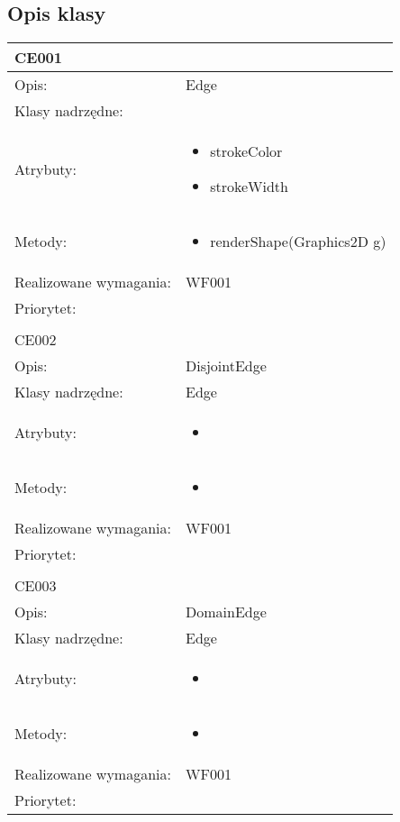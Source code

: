 \documentclass[a4paper,10pt]{article}
\begin{document}
\subsection{Opis klasy}

\begin{center}

\begin{tabular}{|m{3cm}|m{9cm}|} \hline

CE001 &  \\ \hline
Opis: & Edge    \\ \hline
Klasy nadrzędne: &     \\ \hline
Atrybuty: & \begin{itemize}
 \item strokeColor
 \item strokeWidth 
\end{itemize}
 \\ \hline
Metody: & \begin{itemize}
 \item renderShape(Graphics2D g)
\end{itemize}
  \\ \hline
Realizowane wymagania: & WF001 \\ \hline
Priorytet: &  \\ \hline

\multicolumn{2}{c}{} \\
 \hline

CE002 &  \\ \hline
Opis: & DisjointEdge    \\ \hline
Klasy nadrzędne: & Edge    \\ \hline
Atrybuty: & \begin{itemize}
 \item 
\end{itemize}
 \\ \hline
Metody: & \begin{itemize}
 \item 
\end{itemize}
  \\ \hline
Realizowane wymagania: & WF001 \\ \hline
Priorytet: &  \\ \hline

\multicolumn{2}{c}{} \\
 \hline

CE003 &  \\ \hline
Opis: & DomainEdge    \\ \hline
Klasy nadrzędne: & Edge    \\ \hline
Atrybuty: & \begin{itemize}
 \item 
\end{itemize}
 \\ \hline
Metody: & \begin{itemize}
 \item 
\end{itemize}
  \\ \hline
Realizowane wymagania: & WF001 \\ \hline
Priorytet: &  \\ \hline


\end{tabular}
\end{center}
\end{document}
